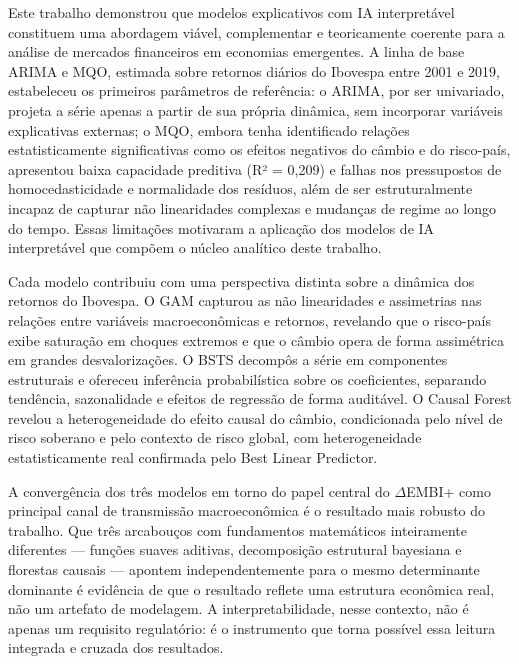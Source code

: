 \documentclass[	12pt, Times, openright, oneside, a4paper, english, brazil]{abntex2}
\begin{document}
Este trabalho demonstrou que modelos explicativos com IA interpretável constituem uma abordagem viável, complementar e teoricamente coerente para a análise de mercados financeiros em economias emergentes. A linha de base ARIMA e MQO, estimada sobre retornos diários do Ibovespa entre 2001 e 2019, estabeleceu os primeiros parâmetros de referência: o ARIMA, por ser univariado, projeta a série apenas a partir de sua própria dinâmica, sem incorporar variáveis explicativas externas; o MQO, embora tenha identificado relações estatisticamente significativas como os efeitos negativos do câmbio e do risco-país, apresentou baixa capacidade preditiva (R² = 0{,}209) e falhas nos pressupostos de homocedasticidade e normalidade dos resíduos, além de ser estruturalmente incapaz de capturar não linearidades complexas e mudanças de regime ao longo do tempo. Essas limitações motivaram a aplicação dos modelos de IA interpretável que compõem o núcleo analítico deste trabalho.

Cada modelo contribuiu com uma perspectiva distinta sobre a dinâmica dos retornos do Ibovespa. O GAM capturou as não linearidades e assimetrias nas relações entre variáveis macroeconômicas e retornos, revelando que o risco-país exibe saturação em choques extremos e que o câmbio opera de forma assimétrica em grandes desvalorizações. O BSTS decompôs a série em componentes estruturais e ofereceu inferência probabilística sobre os coeficientes, separando tendência, sazonalidade e efeitos de regressão de forma auditável. O Causal Forest revelou a heterogeneidade do efeito causal do câmbio, condicionada pelo nível de risco soberano e pelo contexto de risco global, com heterogeneidade estatisticamente real confirmada pelo Best Linear Predictor.

A convergência dos três modelos em torno do papel central do $\Delta$EMBI+ como principal canal de transmissão macroeconômica é o resultado mais robusto do trabalho. Que três arcabouços com fundamentos matemáticos inteiramente diferentes — funções suaves aditivas, decomposição estrutural bayesiana e florestas causais — apontem independentemente para o mesmo determinante dominante é evidência de que o resultado reflete uma estrutura econômica real, não um artefato de modelagem. A interpretabilidade, nesse contexto, não é apenas um requisito regulatório: é o instrumento que torna possível essa leitura integrada e cruzada dos resultados.
\end{document}
